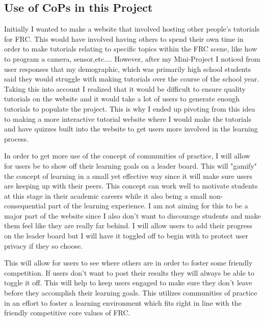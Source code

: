 \documentclass[10pt,twocolumn]{article}
\begin{document}
\subsection{Use of CoPs in this Project}

Initially I wanted to make a website that involved hosting other people's tutorials for FRC. This would have involved having others to spend their own time in order to make tutorials relating to specific topics within the FRC scene, like how to program a camera, sensor,etc.... However, after my Mini-Project I noticed from user responses that my demographic, which was primarily high school students said they would struggle with making tutorials over the course of the school year. Taking this into account I realized that it would be difficult to ensure quality tutorials on the website and it would take a lot of users to generate enough tutorials to populate the project. This is why I ended up pivoting from this idea to making a more interactive tutorial website where I would make the tutorials and have quizzes built into the website to get users more involved in the learning process. 

In order to get more use of the concept of communities of practice, I will allow for users be to show off their learning goals on a leader board. This will "gamify" the concept of learning in a small yet effective way since it will make sure users are keeping up with their peers. This concept can work well to motivate students at this stage in their academic careers while it also being a small non-consequential part of the learning experience. I am not aiming for this to be a major part of the website since I also don't want to discourage students and make them feel like they are really far behind. I will allow users to add their progress on the leader board but I will have it toggled off to begin with to protect user privacy if they so choose.

This will allow for users to see where others are in order to foster some friendly competition. If users don't want to post their results they will always be able to toggle it off. This will help to keep users engaged to make sure they don't leave before they accomplish their learning goals. This utilizes communities of practice in an effort to foster a learning environment which fits right in line with the friendly competitive core values of FRC.
\end{document}
